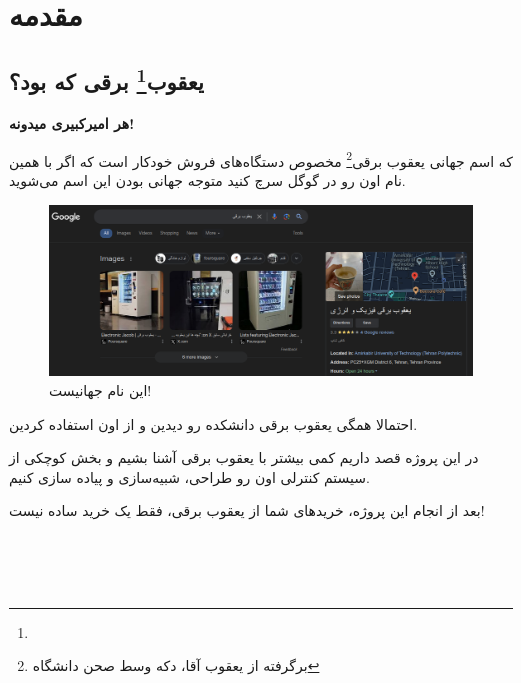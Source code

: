\documentclass[]{article}
\begin{document}
\newpage



 \Large \textbf{\\
}

\section*{{\titr مقدمه}}


\subsection*{{\titr یعقوب\footnote{} برقی که بود؟}}

\textbf{هر امیرکبیری میدونه!}

که اسم جهانی یعقوب برقی\footnote{برگرفته از یعقوب آقا، دکه وسط صحن دانشگاه} مخصوص دستگاه‌های فروش خودکار است که اگر با همین نام اون رو در گوگل سرچ کنید متوجه جهانی بودن این اسم می‌شوید.


\begin{figure}[h]
	\centering
	\includegraphics[width=1\textwidth]{images/img1}
	\caption{این نام جهانیست!}
	\label{این نام جهانیست!}
\end{figure}








احتمالا همگی یعقوب برقی دانشکده رو دیدین و از اون استفاده کردین.

در این پروژه قصد داریم کمی بیشتر با یعقوب برقی آشنا بشیم و بخش کوچکی از سیستم کنترلی اون رو طراحی، شبیه‌سازی و پیاده سازی کنیم.

بعد از انجام این پروژه، خرید‌های شما از یعقوب برقی، فقط یک خرید ساده نیست!




\Large \textbf{\\\\\\
}
\end{document}
